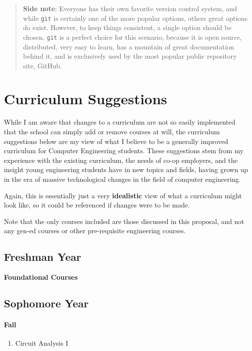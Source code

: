 \documentclass[12pt]{article}
\numberwithin{figure}{section}
\numberwithin{equation}{section}
\begin{document}
{\begin{quote}
\textbf{Side note}: Everyone has their own favorite version control
system, and while \texttt{git} is certainly one of the more popular
options, others great options do exist. However, to keep things
consistent, a single option should be chosen. \texttt{git} is a perfect
choice for this scenario, because it is open source, distributed, very
easy to learn, has a mountain of great documentation behind it, and is
exclusively used by the most popular public repository site, GitHub.
\end{quote}

\section{Curriculum Suggestions}\label{curriculum-suggestions}
While I am aware that changes to a curriculum are not so easily implemented that the school can simply add or remove courses at will, the curriculum suggestions below are my view of what I believe to be a generally improved curriculum for Computer Engineering students. These suggestions stem from my experience with the existing curriculum, the needs of co-op employers, and the insight young engineering students have in new topics and fields, having grown up in the era of massive technological changes in the field of computer engineering.

\bigskip

Again, this is essentially just a very \textbf{idealistic} view of what a curriculum might look like, so it could be referenced if changes were to be made.

\bigskip

Note that the only courses included are those discussed in this proposal, and not any gen-ed courses or other pre-requisite engineering courses.

\subsection{Freshman Year}\label{freshman-year}
\textbf{Foundational Courses}

\subsection{Sophomore Year}\label{sophomore-year}
\paragraph{Fall}\label{sophomore-fall}
\begin{enumerate}
    \item   Circuit Analysis I
\end{enumerate}
}
\end{document}
